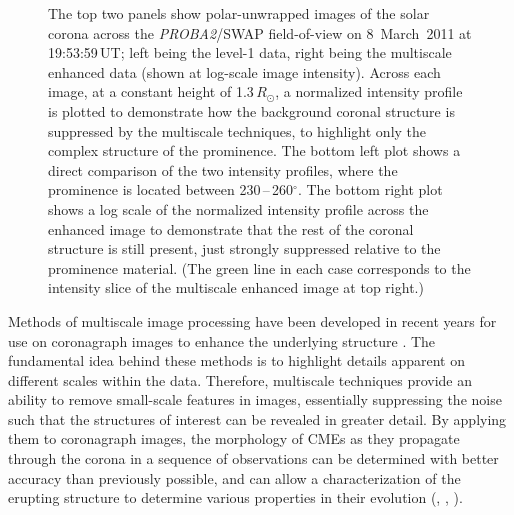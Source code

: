 \documentclass[namedreferences]{solarphysics}
\begin{document}
\begin{article}
\begin{figure}[t]
\caption{The top two panels show polar-unwrapped images of the solar corona across the \emph{PROBA2}/SWAP field-of-view on 8~March~2011 at 19:53:59\,UT; left being the level-1 data, right being the multiscale enhanced data (shown at log-scale image intensity). Across each image, at a constant height of 1.3\,$R_{\odot}$, a normalized intensity profile is plotted to demonstrate how the background coronal structure is suppressed by the multiscale techniques, to highlight only the complex structure of the prominence. The bottom left plot shows a direct comparison of the two intensity profiles, where the prominence is located between 230\,--\,260$^\circ$. The bottom right plot shows a log scale of the normalized intensity profile across the enhanced image to demonstrate that the rest of the coronal structure is still present, just strongly suppressed relative to the prominence material. (The green line in each case corresponds to the intensity slice of the multiscale enhanced image at top right.)}
\label{polar_fig_swap_20110308}
\end{figure}

Methods of multiscale image processing have been developed in recent years for use on coronagraph images to enhance the underlying structure \cite{2008ApJ...674.1201S,2008SoPh..248..457Y,2011AdSpR..47.2118G}. The fundamental idea behind these methods is to highlight details apparent on different scales within the data. Therefore, multiscale techniques provide an ability to remove small-scale features in images, essentially suppressing the noise such that the structures of interest can be revealed in greater detail. By applying them to coronagraph images, the morphology of CMEs as they propagate through the corona in a sequence of observations can be determined with better accuracy than previously possible, and can allow a characterization of the erupting structure to determine various properties in their evolution (, \citeyear{2010NatCo...1E..74B}, \citeyear{2012ApJ...752..145B}). %


\end{article}
\end{document}
